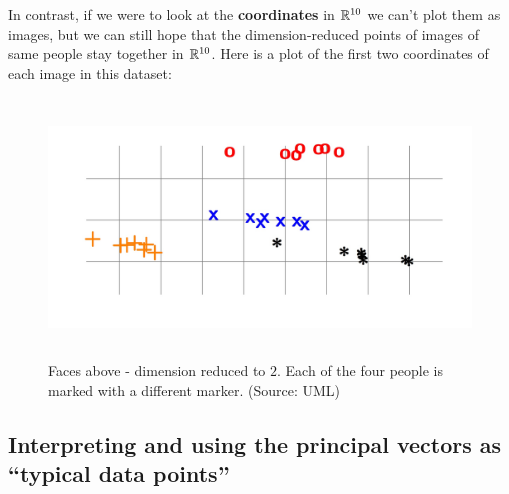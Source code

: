 In contrast, if we were to look at the {\bf coordinates} in $\mathbb{R}^{10}$ we can't
plot them as images, but we can still hope that the dimension-reduced points of
images of same people stay together in $\mathbb{R}^{10}$. Here is a plot of the first
two coordinates of each image in this dataset:
\begin{figure}[H]
      \centering
      \includegraphics[height=2.7in]{pca_faces_proj.jpeg}        
      \caption{Faces above - dimension reduced to $2$. Each of
        the four people is marked with a different marker. (Source:
      UML)} 
    \end{figure}


\subsection{Interpreting and using the principal vectors as ``typical data
points''}

